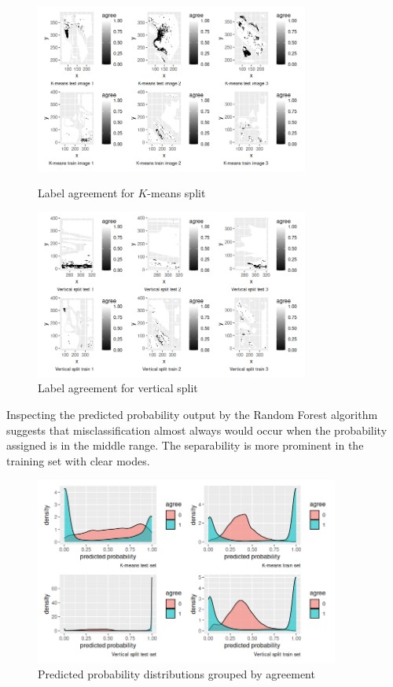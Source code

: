 \documentclass[11pt]{article}
\theoremstyle{definition}
\begin{document}
\begin{figure}[h]
\begin{minipage}[t]{0.5\textwidth}
\centering
\includegraphics[width=9cm]{figures/4b1K.png}
\caption{Label agreement for $K$-means split}
\label{4b1K}
\end{minipage}
\begin{minipage}[t]{0.5\textwidth}
\centering
\includegraphics[width=9cm]{figures/4b1V.png}
\caption{Label agreement for vertical split}
\label{4b1V}
\end{minipage}
\end{figure}
\FloatBarrier 

Inspecting the predicted probability output by the Random Forest algorithm suggests that misclassification almost always would occur when the probability assigned is in the middle range. The separability is more prominent in the training set with clear modes.

\begin{figure}[h]
\centering
\includegraphics[width=10cm]{figures/4b2.png}
\caption{Predicted probability distributions grouped by agreement}
\label{4b2}
\end{figure}
\FloatBarrier
\end{document}
